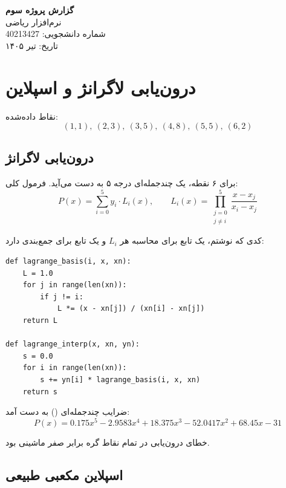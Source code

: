 \documentclass[12pt,a4paper]{article}
\begin{document}
\begin{center}
{\Large\bfseries گزارش پروژه سوم}\\[0.3cm]
{\large نرم‌افزار ریاضی}\\[0.5cm]
شماره دانشجویی: 40213427\\
تاریخ: تیر ۱۴۰۵
\end{center}

\vspace{1cm}

\section{درون‌یابی لاگرانژ و اسپلاین}

نقاط داده‌شده:
$$
(1,1),\ (2,3),\ (3,5),\ (4,8),\ (5,5),\ (6,2)
$$

\subsection{درون‌یابی لاگرانژ}

برای ۶ نقطه، یک چندجمله‌ای درجه ۵ به دست می‌آید. فرمول کلی:
$$
P(x) = \sum_{i=0}^{5} y_i \cdot L_i(x), \qquad L_i(x) = \prod_{\substack{j=0 \\ j\neq i}}^{5} \frac{x - x_j}{x_i - x_j}
$$

کدی که نوشتم، یک تابع  برای محاسبه هر $L_i$ و یک تابع  برای جمع‌بندی دارد:

\begin{latin}
\begin{lstlisting}
def lagrange_basis(i, x, xn):
    L = 1.0
    for j in range(len(xn)):
        if j != i:
            L *= (x - xn[j]) / (xn[i] - xn[j])
    return L

def lagrange_interp(x, xn, yn):
    s = 0.0
    for i in range(len(xn)):
        s += yn[i] * lagrange_basis(i, x, xn)
    return s
\end{lstlisting}
\end{latin}

ضرایب چندجمله‌ای () به دست آمد:
$$
P(x) = 0.175x^5 - 2.9583x^4 + 18.375x^3 - 52.0417x^2 + 68.45x - 31
$$

خطای درون‌یابی در تمام نقاط گره برابر صفر ماشینی بود.

\subsection{اسپلاین مکعبی طبیعی}
\end{document}
